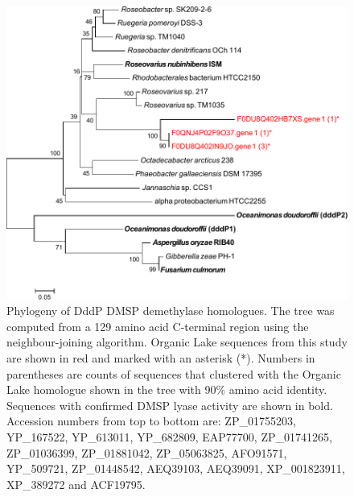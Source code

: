 \begin{figure}
\includegraphics[width=\textwidth]{orglake_figures/dddP_tree.pdf}
\caption[Phylogeny of DddP DMSP lyase homologues]{Phylogeny of DddP DMSP demethylase homologues. The tree was computed from a 129 amino acid C-terminal region using the neighbour-joining algorithm. Organic Lake sequences from this study are shown in red and marked with an asterisk (*). Numbers in parentheses are counts of sequences that clustered with the Organic Lake homologue shown in the tree with 90\% amino acid identity. Sequences with confirmed DMSP lyase activity are shown in bold. Accession numbers from top to bottom are: ZP\_01755203, YP\_167522, YP\_613011, YP\_682809, EAP77700, ZP\_01741265, ZP\_01036399, ZP\_01881042, ZP\_05063825, AFO91571, YP\_509721, ZP\_01448542, AEQ39103, AEQ39091, XP\_001823911, XP\_389272 and ACF19795.}
\label{fig:dddP_tree}

\end{figure}
